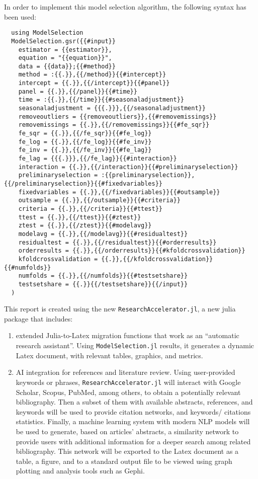 \documentclass{article}
\begin{document}
In order to implement this model selection algorithm, the following syntax has been used:

\begin{lstlisting} 
  using ModelSelection
  ModelSelection.gsr({{#input}}
    estimator = {{estimator}},
    equation = "{{equation}}",
    data = {{data}};{{#method}}
    method = :{{.}},{{/method}}{{#intercept}}
    intercept = {{.}},{{/intercept}}{{#panel}}
    panel = {{.}},{{/panel}}{{#time}}
    time = :{{.}},{{/time}}{{#seasonaladjustment}}
    seasonaladjustment = {{{.}}},{{/seasonaladjustment}}
    removeoutliers = {{removeoutliers}},{{#removemissings}}
    removemissings = {{.}},{{/removemissings}}{{#fe_sqr}}
    fe_sqr = {{.}},{{/fe_sqr}}{{#fe_log}}
    fe_log = {{.}},{{/fe_log}}{{#fe_inv}}
    fe_inv = {{.}},{{/fe_inv}}{{#fe_lag}}
    fe_lag = {{{.}}},{{/fe_lag}}{{#interaction}}
    interaction = {{.}},{{/interaction}}{{#preliminaryselection}}
    preliminaryselection = :{{preliminaryselection}},{{/preliminaryselection}}{{#fixedvariables}}
    fixedvariables = {{.}},{{/fixedvariables}}{{#outsample}}
    outsample = {{.}},{{/outsample}}{{#criteria}}
    criteria = {{.}},{{/criteria}}{{#ttest}}
    ttest = {{.}},{{/ttest}}{{#ztest}}
    ztest = {{.}},{{/ztest}}{{#modelavg}}
    modelavg = {{.}},{{/modelavg}}{{#residualtest}}
    residualtest = {{.}},{{/residualtest}}{{#orderresults}}
    orderresults = {{.}},{{/orderresults}}{{#kfoldcrossvalidation}}
    kfoldcrossvalidation = {{.}},{{/kfoldcrossvalidation}}{{#numfolds}}
    numfolds = {{.}},{{/numfolds}}{{#testsetshare}}
    testsetshare = {{.}}{{/testsetshare}}{{/input}}
  )
\end{lstlisting}

This report is created using the new \verb|ResearchAccelerator.jl|, a new julia package that includes:
\begin{enumerate}
  \item extended Julia-to-Latex migration functions that work as an “automatic research assistant”. Using \verb|ModelSelection.jl| results, it generates a dynamic Latex document, with relevant tables, graphics, and metrics.
  
  \item AI integration for references and literature review. Using user-provided keywords or phrases, \verb|ResearchAccelerator.jl| will interact with Google Scholar, Scopus, PubMed, among others, to obtain a potentially relevant bibliography. Then a subset of them with available abstracts, references, and keywords will be used to provide citation networks, and keywords/ citations statistics. Finally, a machine learning system with modern NLP models will be used to generate, based on articles’ abstracts, a similarity network to provide users with additional information for a deeper search among related bibliography. This network will be exported to the Latex document as a table, a figure, and to a standard output file to be viewed using graph plotting and analysis tools such as Gephi.
\end{enumerate}
\end{document}

